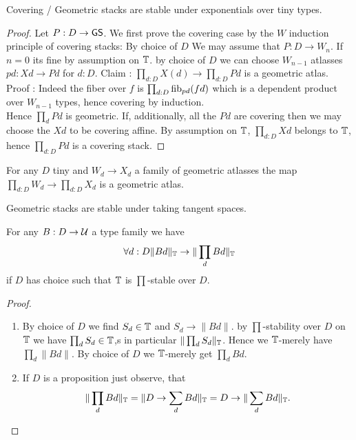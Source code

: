\begin{theorem}
	Covering / Geometric stacks are stable under exponentials over tiny types.
\end{theorem}
\begin{proof}
	Let $P : D \to \mathsf{GS}$. 
	We first prove the covering case by the $W$ induction principle of covering stacks: By choice of $D$ We may assume that $P : D \to W_n$. If $n = 0$ its fine by assumption on $\mathbb{T}$.
	by choice of $D$ we can choose $W_{n-1}$ atlasses $p d : X d \to P d$ for $d : D$.
	Claim :  $\prod_{d: D} X(d) \to \prod_{d : D} P d$ is a geometric atlas.
	Proof : Indeed the fiber over $f$ is $\prod_{d : D} \operatorname{fib}_{p d} (f d)$ which is a dependent product over $W_{n-1}$ types, hence covering by induction. \\
	Hence $\prod_d P d$ is geometric.
	If, additionally, all the $P d$ are covering then we may choose the $X d$ to be covering affine. By assumption on $\mathbb{T}$, $\prod_{d: D} X d$ belongs to $\mathbb{T}$, hence $\prod_{d: D} P d$ is a covering stack.
\end{proof}
\begin{corollary}{\label{cor:GeomAtlExpStable}}
		For any $D$ tiny and $W_d \to X_d$ a family of geometric atlasses the map $\prod_{d : D} W_d \to \prod_{d: D} X_d$ is a geometric atlas.
\end{corollary}
\begin{corollary}
	Geometric stacks are stable under taking tangent spaces.
\end{corollary}
\begin{lemma}{\label{lemma:TinyStrongLocalChoice}}
 	For any $B : D \to \mathcal{U}$ a type family we have
	\[
	\forall d:D \|B d\|_{\mathbb{T}} \to \| \prod_d B d\|_{\mathbb{T}}
	\]
	if $D$ has choice  such that $\mathbb{T}$ is $\prod$-stable over $D$.  
%		
\end{lemma}
\begin{proof}
	\begin{enumerate}
		\item 
	By choice of $D$ we find $S_d \in \mathbb{T}$ and $S_d \to \|B d\|$. by $\prod$-stability over $D$ on $\mathbb{T}$ we have $\prod_d S_d \in \mathbb{T}$,s  in particular $\| \prod_d S_d \|_{\mathbb{T}}$. Hence we $\mathbb{T}$-merely have $\prod_d \| B d\|.$ By choice of $D$ we $\mathbb{T}$-merely get $\prod_d B d$. 
	\item 	If $D$ is a proposition just observe, that 
	\[\| \prod_d B d \|_{\mathbb{T}}= \| D \to \sum_d B d \|_{\mathbb{T}} = D \to \|\sum_d B d\|_{\mathbb{T}}.\]
		\end{enumerate}
\end{proof}
